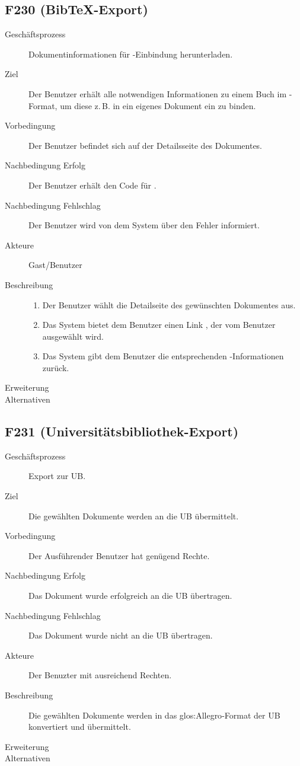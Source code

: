 \subsection{F230 (Bib\TeX -Export)}
\begin{description}
  \item[Geschäftsprozess]Dokumentinformationen für \BibTeX-Einbindung herunterladen.
  \item[Ziel]Der Benutzer erhält alle notwendigen Informationen zu einem Buch im \BibTeX-Format, um diese z.\,B. in ein eigenes Dokument ein zu binden.
  \item[Vorbedingung]Der Benutzer befindet sich auf der Detailsseite des Dokumentes.
  \item[Nachbedingung Erfolg]Der Benutzer erhält den Code für \BibTeX .
  \item[Nachbedingung Fehlschlag]Der Benutzer wird von dem System über den Fehler informiert.
  \item[Akteure]Gast/Benutzer
  \item[Beschreibung]\hfill
    \begin{enumerate}
      \item Der Benutzer wählt die Detailseite des gewünschten Dokumentes aus.
      \item Das System bietet dem Benutzer einen Link \emph{\BibTeX}, der vom Benutzer ausgewählt wird.
      \item Das System gibt dem Benutzer die entsprechenden \BibTeX -Informationen zurück.
    \end{enumerate}
  \item[Erweiterung]
  \item[Alternativen]
\end{description}

\subsection{F231 (Universitätsbibliothek-Export)}
\begin{description}
  \item[Geschäftsprozess]Export zur \gls{UB}.
  \item[Ziel]Die gewählten Dokumente werden an die \gls{UB} übermittelt.
  \item[Vorbedingung]Der Ausführender Benutzer hat genügend Rechte.
  \item[Nachbedingung Erfolg]Das Dokument wurde erfolgreich an die \gls{UB} übertragen.
  \item[Nachbedingung Fehlschlag]Das Dokument wurde nicht an die \gls{UB} übertragen.
  \item[Akteure]Der Benuzter mit ausreichend Rechten.
  \item[Beschreibung]Die gewählten Dokumente werden in das \gls{glos:Allegro}-Format der \gls{UB} konvertiert und übermittelt.
  \item[Erweiterung]
  \item[Alternativen]
\end{description}


